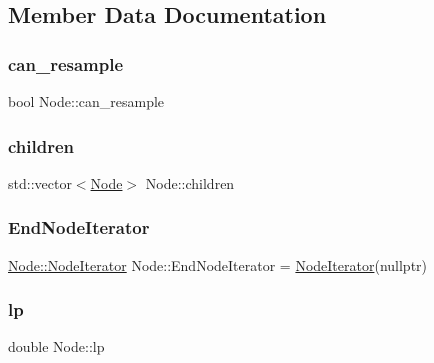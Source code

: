 \subsection{Member Data Documentation}
\mbox{\label{class_node_a98c14a51b240fbc7e438f40a12276257}} 
\subsubsection{\texorpdfstring{can\+\_\+resample}{can\_resample}}
{\footnotesize\ttfamily bool Node\+::can\+\_\+resample}

\mbox{\label{class_node_af7ddc81358470c3bf7a7819c8b77f53d}} 
\subsubsection{\texorpdfstring{children}{children}}
{\footnotesize\ttfamily std\+::vector$<$\hyperlink{class_node}{Node}$>$ Node\+::children\hspace{0.3cm}{\ttfamily [protected]}}

\mbox{\label{class_node_a336943f2e37a2b6fcbe8b47634719dec}} 
\subsubsection{\texorpdfstring{End\+Node\+Iterator}{EndNodeIterator}}
{\footnotesize\ttfamily \hyperlink{class_node_1_1_node_iterator}{Node\+::\+Node\+Iterator} Node\+::\+End\+Node\+Iterator = \hyperlink{class_node_1_1_node_iterator}{Node\+Iterator}(nullptr)\hspace{0.3cm}{\ttfamily [static]}}

\mbox{\label{class_node_a298eaa3743b774a3f9ef396e1dc42a08}} 
\subsubsection{\texorpdfstring{lp}{lp}}
{\footnotesize\ttfamily double Node\+::lp}

